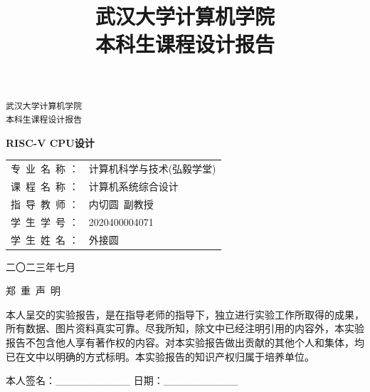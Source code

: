 \documentclass[UTF8,a4paper,autofakebold,15pt]{ctexart}
\title{武汉大学计算机学院\\
	本科生课程设计报告
}
\author{}
\date{}
\begin{document}
	
	\begin{center}
		
	\vspace{50pt}
	{\tt 武汉大学计算机学院\\\vspace{10pt}
		本科生课程设计报告}
	
	\vspace{50pt}
	
	{\heiti{}\bf RISC-V CPU设计}
	
	\vspace{100pt}
	
	\begin{spacing}{1.5}
	\qquad\begin{tabular}{ll}
		专\ 业\ 名\ 称   ：&计算机科学与技术(弘毅学堂)\\
		
		课\ 程\ 名\ 称   ：&计算机系统综合设计\\
		
		指\ 导\ 教\ 师   ：&内切圆\ 副教授\\
		
		学\ 生\ 学\ 号   ：&2020400004071\\
		
		学\ 生\ 姓\ 名   ：&外接圆
	\end{tabular}

	\end{spacing}

	\vspace{100pt}

	 二〇二三年七月
	
	\end{center}
	

\newpage

	\begin{center}
	{\Sonti 郑\ 重\ 声\ 明}
	\end{center}

	\vspace{40pt}
	
	本人呈交的实验报告，是在指导老师的指导下，独立进行实验工作所取得的成果，所有数据、图片资料真实可靠。尽我所知，除文中已经注明引用的内容外，本实验报告不包含他人享有著作权的内容。对本实验报告做出贡献的其他个人和集体，均已在文中以明确的方式标明。本实验报告的知识产权归属于培养单位。
	
	\vspace{40pt}
	
	本人签名：\_\_\_\_\_\_\_\_\_\_  \qquad\qquad\qquad        日期：\_\_\_\_\_\_\_\_\_\_
	
\end{document}
